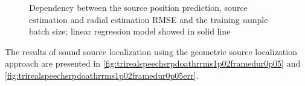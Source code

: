 \documentclass[applsci,article,submit,moreauthors,pdftex]{Definitions/mdpi}
\begin{document}
\begin{figure}[h!]
	\centering
	\caption{Dependency between the source position prediction, source \doa{} estimation  and radial estimation RMSE and the \grnn{} training sample batch size; linear regression model showed in solid line}
	\label{fig:rmsebatchsize}
\end{figure}



The results of sound source localization using the geometric source localization approach are presented in \figurename \ref{fig:trirealspeechsrpdoathrrms1p02framedur0p05} and \figurename \ref{fig:trirealspeechsrpdoathrrms1p02framedur0p05err}.
\end{document}
